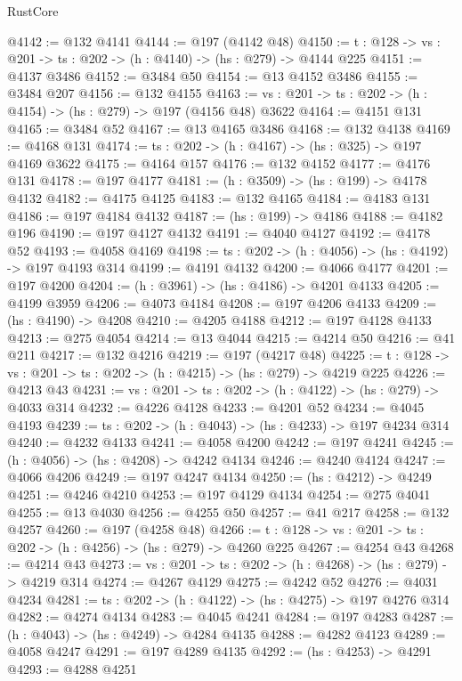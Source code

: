 \begin{lexlean}{RustCore}
\begin{coremodule}
@4142 := @132 @4141
@4144 := @197 (@4142 @48)
@4150 := {t : @128} -> {vs : @201} -> {ts : @202} -> (h : @4140) -> (hs : @279) -> @4144 @225
@4151 := @4137 @3486
@4152 := @3484 @50
@4154 := @13 @4152 @3486
@4155 := @3484 @207
@4156 := @132 @4155
@4163 := {vs : @201} -> {ts : @202} -> (h : @4154) -> (hs : @279) -> @197 (@4156 @48) @3622
@4164 := @4151 @131
@4165 := @3484 @52
@4167 := @13 @4165 @3486
@4168 := @132 @4138
@4169 := @4168 @131
@4174 := {ts : @202} -> (h : @4167) -> (hs : @325) -> @197 @4169 @3622
@4175 := @4164 @157
@4176 := @132 @4152
@4177 := @4176 @131
@4178 := @197 @4177
@4181 := (h : @3509) -> (hs : @199) -> @4178 @4132
@4182 := @4175 @4125
@4183 := @132 @4165
@4184 := @4183 @131
@4186 := @197 @4184 @4132
@4187 := (hs : @199) -> @4186
@4188 := @4182 @196
@4190 := @197 @4127 @4132
@4191 := @4040 @4127
@4192 := @4178 @52
@4193 := @4058 @4169
@4198 := {ts : @202} -> (h : @4056) -> (hs : @4192) -> @197 @4193 @314
@4199 := @4191 @4132
@4200 := @4066 @4177
@4201 := @197 @4200
@4204 := (h : @3961) -> (hs : @4186) -> @4201 @4133
@4205 := @4199 @3959
@4206 := @4073 @4184
@4208 := @197 @4206 @4133
@4209 := (hs : @4190) -> @4208
@4210 := @4205 @4188
@4212 := @197 @4128 @4133
@4213 := @275 @4054
@4214 := @13 @4044
@4215 := @4214 @50
@4216 := @41 @211
@4217 := @132 @4216
@4219 := @197 (@4217 @48)
@4225 := {t : @128} -> {vs : @201} -> {ts : @202} -> (h : @4215) -> (hs : @279) -> @4219 @225
@4226 := @4213 @43
@4231 := {vs : @201} -> {ts : @202} -> (h : @4122) -> (hs : @279) -> @4033 @314
@4232 := @4226 @4128
@4233 := @4201 @52
@4234 := @4045 @4193
@4239 := {ts : @202} -> (h : @4043) -> (hs : @4233) -> @197 @4234 @314
@4240 := @4232 @4133
@4241 := @4058 @4200
@4242 := @197 @4241
@4245 := (h : @4056) -> (hs : @4208) -> @4242 @4134
@4246 := @4240 @4124
@4247 := @4066 @4206
@4249 := @197 @4247 @4134
@4250 := (hs : @4212) -> @4249
@4251 := @4246 @4210
@4253 := @197 @4129 @4134
@4254 := @275 @4041
@4255 := @13 @4030
@4256 := @4255 @50
@4257 := @41 @217
@4258 := @132 @4257
@4260 := @197 (@4258 @48)
@4266 := {t : @128} -> {vs : @201} -> {ts : @202} -> (h : @4256) -> (hs : @279) -> @4260 @225
@4267 := @4254 @43
@4268 := @4214 @43
@4273 := {vs : @201} -> {ts : @202} -> (h : @4268) -> (hs : @279) -> @4219 @314
@4274 := @4267 @4129
@4275 := @4242 @52
@4276 := @4031 @4234
@4281 := {ts : @202} -> (h : @4122) -> (hs : @4275) -> @197 @4276 @314
@4282 := @4274 @4134
@4283 := @4045 @4241
@4284 := @197 @4283
@4287 := (h : @4043) -> (hs : @4249) -> @4284 @4135
@4288 := @4282 @4123
@4289 := @4058 @4247
@4291 := @197 @4289 @4135
@4292 := (hs : @4253) -> @4291
@4293 := @4288 @4251

\end{coremodule}
\end{lexlean}
